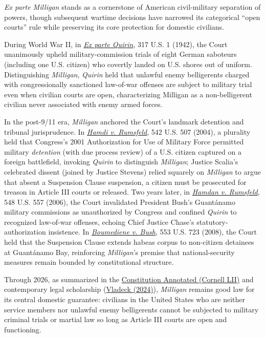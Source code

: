 \documentclass[12pt]{article}
\begin{document}
\textit{Ex parte Milligan} stands as a cornerstone of American civil-military separation of powers, though subsequent wartime decisions have narrowed its categorical ``open courts'' rule while preserving its core protection for domestic civilians.

During World War II, in \href{https://supreme.justia.com/cases/federal/us/317/1/}{\textit{Ex parte Quirin}}, 317 U.S. 1 (1942), the Court unanimously upheld military-commission trials of eight German saboteurs (including one U.S. citizen) who covertly landed on U.S. shores out of uniform. Distinguishing \textit{Milligan}, \textit{Quirin} held that unlawful enemy belligerents charged with congressionally sanctioned law-of-war offenses are subject to military trial even when civilian courts are open, characterizing Milligan as a non-belligerent civilian never associated with enemy armed forces.

In the post-9/11 era, \textit{Milligan} anchored the Court's landmark detention and tribunal jurisprudence. In \href{https://supreme.justia.com/cases/federal/us/542/507/}{\textit{Hamdi v. Rumsfeld}}, 542 U.S. 507 (2004), a plurality held that Congress's 2001 Authorization for Use of Military Force permitted military \textit{detention} (with due process review) of a U.S. citizen captured on a foreign battlefield, invoking \textit{Quirin} to distinguish \textit{Milligan}; Justice Scalia's celebrated dissent (joined by Justice Stevens) relied squarely on \textit{Milligan} to argue that absent a Suspension Clause suspension, a citizen must be prosecuted for treason in Article III courts or released. Two years later, in \href{https://supreme.justia.com/cases/federal/us/548/557/}{\textit{Hamdan v. Rumsfeld}}, 548 U.S. 557 (2006), the Court invalidated President Bush's Guant\'{a}namo military commissions as unauthorized by Congress and confined \textit{Quirin} to recognized law-of-war offenses, echoing Chief Justice Chase's statutory-authorization insistence. In \href{https://supreme.justia.com/cases/federal/us/553/723/}{\textit{Boumediene v. Bush}}, 553 U.S. 723 (2008), the Court held that the Suspension Clause extends habeas corpus to non-citizen detainees at Guant\'{a}namo Bay, reinforcing \textit{Milligan}'s premise that national-security measures remain bounded by constitutional structure.

Through 2026, as summarized in the \href{https://www.law.cornell.edu/constitution-conan/article-3/section-1/non-article-iii-military-courts}{Constitution Annotated (Cornell LII)} and contemporary legal scholarship (\href{https://www.stevevladeck.com/p/111-ex-parte-milligan-and-the-limits}{Vladeck (2024)}), \textit{Milligan} remains good law for its central domestic guarantee: civilians in the United States who are neither service members nor unlawful enemy belligerents cannot be subjected to military criminal trials or martial law so long as Article III courts are open and functioning.
\end{document}
